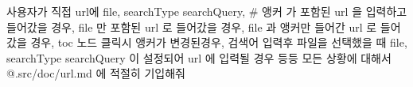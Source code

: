 사용자가 직접 url에 file, searchType searchQuery, # 앵커 가 포함된 url 을  입력하고 들어갔을 경우, file 만 포함된 url 로 들어갔을 경우, file 과 앵커만 들어간 url 로 들어갔을 경우, toc 노드 클릭시 앵커가 변경된경우, 검색어 입력후 파일을 선택했을 때 file, searchType searchQuery 이 설정되어 url 에 입력될 
경우 등등 모든 상황에 대해서 @.src/doc/url.md 에 적절히 기입해줘